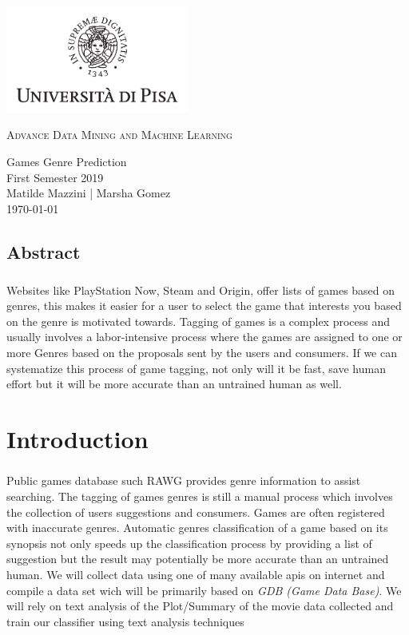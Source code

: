 \documentclass{book}
\author{Matilde Mazzini | Marsha Gomez Gomez}
\begin{document}
    \begin{titlepage}
        \centering
        \includegraphics[width=6cm]{unipi}
        \vfill
        \vspace{1.5cm}
        {\huge\textsc{Advance Data Mining and Machine Learning}\par}
        {\Large
            Games Genre Prediction\\
            First Semester 2019\\
            \vskip2cm
            Matilde Mazzini | Marsha Gomez\\
            \vskip2cm
            \today
        }    
        \vfill
        \vfill
    \end{titlepage}
    \tableofcontents

    \section*{Abstract}
    \paragraph{}
    Websites like PlayStation Now, Steam and Origin, offer lists of games based on genres, this makes it easier for a user to select the game that interests you based on the genre is motivated towards. Tagging of games is a complex process and usually involves a labor-intensive process where the games are assigned to one or more Genres based on the proposals sent by the users and consumers. If we can systematize this process of game tagging, not only will it be fast, save human effort but it will be more accurate than an untrained human as well.

    \chapter{Introduction}
    \paragraph{}
    Public games database such RAWG provides genre information to assist searching. The tagging of games genres is still a manual process which involves the collection of users suggestions and consumers. Games are often registered with inaccurate genres. Automatic genres classification of a game based on its synopsis not only speeds up the classification process by providing a list of suggestion but the result may potentially be more accurate than an untrained human. We will collect data using one of many available apis on internet and compile a data set wich will be primarily based on \textit{GDB (Game Data Base)}. We will rely on text analysis of the Plot/Summary of the movie data collected and train our classifier using text analysis techniques
\end{document}
